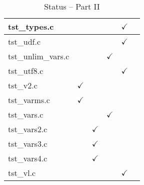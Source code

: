 \begin{table}[H]
\begin{tabular}{|l|c|c|c|c|c|}
tst\_types.c   &   &   &   & $\checkmark$  &   \\ \hline
tst\_udf.c   &   &   &   &  $\checkmark$ &   \\ \hline
tst\_unlim\_vars.c   &   &   &  $\checkmark$ &   &   \\ \hline
tst\_utf8.c   &   &   &   & $\checkmark$  &   \\ \hline
tst\_v2.c   & $\checkmark$  &   &   &   &   \\ \hline
tst\_varms.c   &  $\checkmark$ &   &   &   &   \\ \hline
tst\_vars.c   &   &   & $\checkmark$  &   &   \\ \hline
tst\_vars2.c   &   & $\checkmark$  &   &   &   \\ \hline
tst\_vars3.c   &   & $\checkmark$  &   &   &   \\ \hline
tst\_vars4.c   &   & $\checkmark$  &   &   &   \\ \hline
tst\_vl.c   &   &   &   & $\checkmark$  &   \\ \hline
\hline
\end{tabular}
\caption{Status -- Part II}
\end{table}
